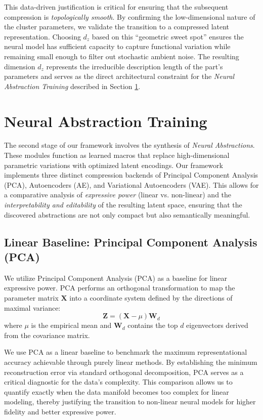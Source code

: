\documentclass{thesis}
\begin{document}
This data-driven justification is critical for ensuring that the subsequent compression is \textit{topologically smooth}. By confirming the low-dimensional nature of the cluster parameters, we validate the transition to a compressed latent representation. Choosing $d_z$ based on this ``geometric sweet spot'' ensures the neural model has sufficient capacity to capture functional variation while remaining small enough to filter out stochastic ambient noise. The resulting dimension $d_z$ represents the irreducible description length of the part's parameters and serves as the direct architectural constraint for the \textit{Neural Abstraction Training} described in Section \ref{sec:neural_training}.

\section{Neural Abstraction Training}\label{sec:neural_training}

The second stage of our framework involves the synthesis of \textit{Neural Abstractions}. These modules function as learned macros that replace high-dimensional parametric variations with optimized latent encodings. Our framework implements three distinct compression backends of Principal Component Analysis (PCA), Autoencoders (AE), and Variational Autoencoders (VAE). This allows for a comparative analysis of \textit{expressive power} (linear vs. non-linear) and the \textit{interpretability and editability} of the resulting latent space, ensuring that the discovered abstractions are not only compact but also semantically meaningful.

\subsection{Linear Baseline: Principal Component Analysis (PCA)}

We utilize Principal Component Analysis (PCA) as a baseline for linear expressive power. PCA performs an orthogonal transformation to map the parameter matrix $\mathbf{X}$ into a coordinate system defined by the directions of maximal variance:
\begin{equation}
    \mathbf{Z} = (\mathbf{X} - \mu) \mathbf{W}_d
\end{equation}
where $\mu$ is the empirical mean and $\mathbf{W}_d$ contains the top $d$ eigenvectors derived from the covariance matrix. 

We use PCA as a linear baseline to benchmark the maximum representational accuracy achievable through purely linear methods. By establishing the minimum reconstruction error via standard orthogonal decomposition, PCA serves as a critical diagnostic for the data's complexity. This comparison allows us to quantify exactly when the data manifold becomes too complex for linear modeling, thereby justifying the transition to non-linear neural models for higher fidelity and better expressive power.
\end{document}
